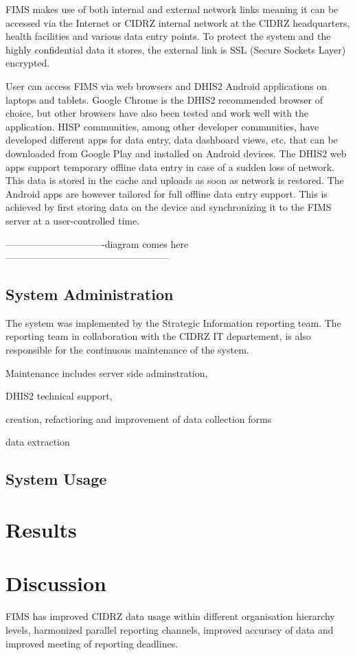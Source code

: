 \documentclass[conference]{IEEEtran}
\begin{document}
FIMS makes use of both internal and external network links meaning it can be accessed via the Internet or CIDRZ internal network at the CIDRZ headquarters, health facilities and various data entry points. To protect the system and the highly confidential data it stores, the external link is
SSL (Secure Sockets Layer) encrypted.

User can access FIMS via web browsers and DHIS2 Android applications on laptops and tablets. Google Chrome is the DHIS2 recommended browser of choice, but other browsers have also been tested and work well with the application. HISP communities, among other developer communities,
have developed different apps for data entry, data dashboard views, etc. that can be downloaded from Google Play and installed on Android devices. The DHIS2 web apps support temporary offline data entry in case of a sudden loss of network. This data is stored in the cache and uploads as soon as network
is restored. The Android apps are however tailored for full offline data entry support. This is achieved by first storing data on the device and synchronizing it to the FIMS server at a user-controlled time.

-------------------------------diagram comes here---------------------------------------------------

\subsection{System Administration}
The system was implemented by the Strategic Information reporting team. The reporting team in collaboration with the CIDRZ IT departement, is also responsible for the continuous maintenance of the system.

Maintenance includes server side adminstration, 

DHIS2 technical support, 

creation, refactioring and improvement of data collection forms

data extraction

\subsection{System Usage}

\section{Results}

\section{Discussion}
FIMS has improved CIDRZ data usage within different organisation hierarchy levels, harmonized parallel reporting channels, improved accuracy of data and improved meeting of reporting deadlines.
\end{document}
